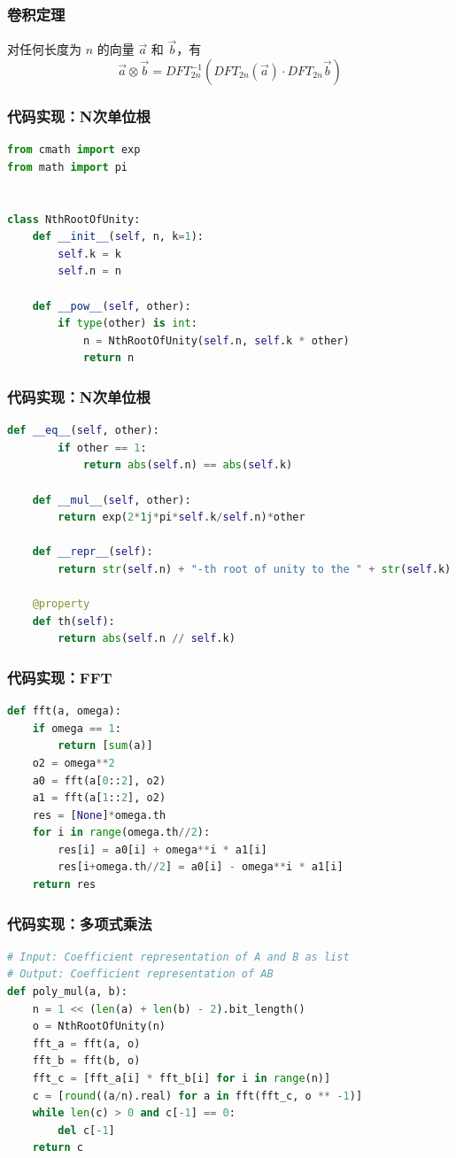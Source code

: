 \documentclass[UTF8]{ctexbeamer}
\begin{document}
\begin{frame}
    \frametitle{卷积定理}
    对任何长度为 $n$ 的向量 $\vec{a}$ 和 $\vec{b}$，有
    $$\vec{a} \otimes \vec{b} = DFT_{2n}^{-1}(DFT_{2n}(\vec{a}) · DFT_{2n}{\vec{b}})$$
\end{frame}

\begin{frame}[fragile]
    \frametitle{代码实现：N次单位根}
    \begin{lstlisting}[language=Python]
from cmath import exp
from math import pi


class NthRootOfUnity:
    def __init__(self, n, k=1):
        self.k = k
        self.n = n

    def __pow__(self, other):
        if type(other) is int:
            n = NthRootOfUnity(self.n, self.k * other)
            return n
    \end{lstlisting}
\end{frame}

\begin{frame}[fragile]
    \frametitle{代码实现：N次单位根}
    \begin{lstlisting}[language=Python] 
    def __eq__(self, other):
        if other == 1:
            return abs(self.n) == abs(self.k)

    def __mul__(self, other):
        return exp(2*1j*pi*self.k/self.n)*other

    def __repr__(self):
        return str(self.n) + "-th root of unity to the " + str(self.k)

    @property
    def th(self):
        return abs(self.n // self.k)
    \end{lstlisting}
\end{frame}

\begin{frame}[fragile]
    \frametitle{代码实现：FFT}
    \begin{lstlisting}[language=Python] 
def fft(a, omega):
    if omega == 1:
        return [sum(a)]
    o2 = omega**2
    a0 = fft(a[0::2], o2)
    a1 = fft(a[1::2], o2)
    res = [None]*omega.th
    for i in range(omega.th//2):
        res[i] = a0[i] + omega**i * a1[i]
        res[i+omega.th//2] = a0[i] - omega**i * a1[i]
    return res
    \end{lstlisting}
\end{frame}

\begin{frame}[fragile]
    \frametitle{代码实现：多项式乘法}
    \begin{lstlisting}[language=Python]
# Input: Coefficient representation of A and B as list
# Output: Coefficient representation of AB
def poly_mul(a, b):
    n = 1 << (len(a) + len(b) - 2).bit_length()
    o = NthRootOfUnity(n)
    fft_a = fft(a, o)
    fft_b = fft(b, o)
    fft_c = [fft_a[i] * fft_b[i] for i in range(n)]
    c = [round((a/n).real) for a in fft(fft_c, o ** -1)]
    while len(c) > 0 and c[-1] == 0:
        del c[-1]
    return c
    \end{lstlisting}
\end{frame}
\end{document}
